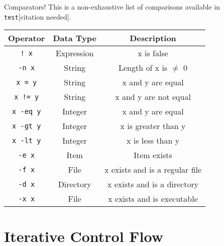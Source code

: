 \documentclass[11pt]{beamer}
\begin{document}
\begin{frame}[fragile=singleslide]{Comparators!}
This is a non-exhaustive list of comparisons available in \texttt{test}[citation needed].
\center
\begin{tabular}{| c | c | c |}
\hline
Operator & Data Type & Description \\ \hline \hline
\texttt{! x} & Expression & x is false \\ \hline \hline
\texttt{-n x} & String & Length of x is $\neq$ 0 \\ \hline
\texttt{x = y} & String & x and y are equal \\ \hline
\texttt{x != y} & String & x and y are not equal \\ \hline \hline
\texttt{x -eq y} & Integer & x and y are equal \\ \hline
\texttt{x -gt y} & Integer & x is greater than y \\ \hline
\texttt{x -lt y} & Integer & x is less than y \\ \hline \hline
\texttt{-e x} & Item & Item exists \\ \hline \hline
\texttt{-f x} & File & x exists and is a regular file \\ \hline
\texttt{-d x} & Directory & x exists and is a directory \\ \hline
\texttt{-x x} & File & x exists and is executable \\ \hline
\end{tabular}

\end{frame}

\section[Loops]{Iterative Control Flow}
\end{document}
